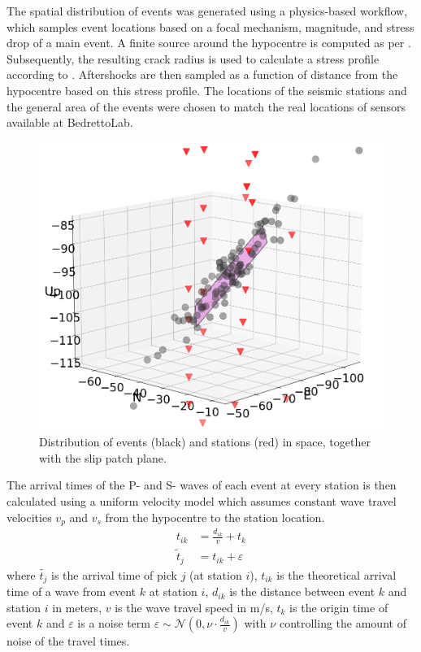 \documentclass{scrreprt}
\begin{document}
The spatial distribution of events was generated using a physics-based workflow, which samples event locations based on a focal mechanism, magnitude, and stress drop of a main event. A finite source around the hypocentre is computed as per \citet{Meier2014}. Subsequently, the resulting crack radius is used to calculate a stress profile according to \citet{Dietrich94}. Aftershocks are then sampled as a function of distance from the hypocentre based on this stress profile. The locations of the seismic stations and the general area of the events were chosen to match the real locations of sensors available at BedrettoLab.

\begin{figure}[ht]
\centering
\includegraphics[width=0.65\linewidth]{plots/events_3d.png}
\caption{\label{fig:3d}Distribution of events (black) and stations (red) in space, together with the slip patch plane.}
\end{figure}

The arrival times of the P- and S- waves of each event at every station is then calculated using a uniform velocity model which assumes constant wave travel velocities $v_p$ and $v_s$ from the hypocentre to the station location. 
\begin{equation} \label{vel}
    \begin{aligned}
    t_{ik} & = \frac{d_{ik}}{v} + t_k \\
    \tilde{t}_j & = t_{ik} + \varepsilon
    \end{aligned}
\end{equation}
where $\tilde{t_j}$ is the arrival time of pick $j$ (at station $i$), $t_{ik}$ is the theoretical arrival time of a wave from event $k$ at station $i$, $d_{ik}$ is the distance between event $k$ and station $i$ in meters, $v$ is the wave travel speed in m/s, $t_k$ is the origin time of event $k$ and $\varepsilon$ is a noise term \(\varepsilon \sim \mathcal{N}(0, \nu \cdot \frac{d_{ik}}{v})\) with $\nu$ controlling the amount of noise of the travel times.
\end{document}
